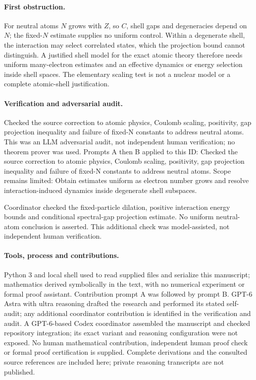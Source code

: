 \documentclass[11pt]{article}
\begin{document}
\paragraph{First obstruction.}For neutral atoms \(N\) grows with \(Z\), so \(C\), shell gaps and degeneracies depend on \(N\); the fixed-\(N\) estimate supplies no uniform control. Within a degenerate shell, the interaction may select correlated states, which the projection bound cannot distinguish. A justified shell model for the exact atomic theory therefore needs uniform many-electron estimates and an effective dynamics or energy selection inside shell spaces. The elementary scaling test is not a nuclear model or a complete atomic-shell justification.

\paragraph{Verification and adversarial audit.}
Checked the source correction to atomic physics, Coulomb scaling, positivity, gap projection inequality and failure of fixed-N constants to address neutral atoms. This was an LLM adversarial audit, not independent human verification; no theorem prover was used. Prompts A then B applied to this ID: Checked the source correction to atomic physics, Coulomb scaling, positivity, gap projection inequality and failure of fixed-N constants to address neutral atoms. Scope remains limited: Obtain estimates uniform as electron number grows and resolve interaction-induced dynamics inside degenerate shell subspaces.

Coordinator checked the fixed-particle dilation, positive interaction energy bounds and conditional spectral-gap projection estimate. No uniform neutral-atom conclusion is asserted. This additional check was model-assisted, not independent human verification.

\paragraph{Tools, process and contributions.}
Python 3 and local shell used to read supplied files and serialize this manuscript; mathematics derived symbolically in the text, with no numerical experiment or formal proof assistant. Contribution prompt A was followed by prompt B. GPT-6 Astra with ultra reasoning drafted the research and performed its stated self-audit; any additional coordinator contribution is identified in the verification and audit. A GPT-6-based Codex coordinator assembled the manuscript and checked repository integration; its exact variant and reasoning configuration were not exposed. No human mathematical contribution, independent human proof check or formal proof certification is supplied. Complete derivations and the consulted source references are included here; private reasoning transcripts are not published.
\end{document}
